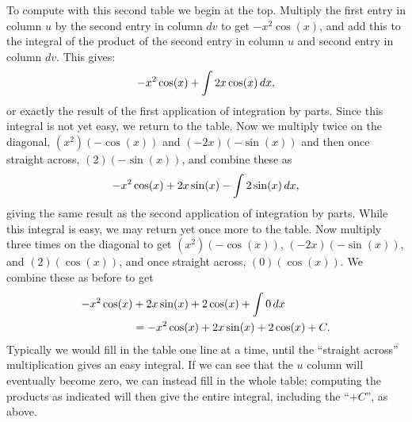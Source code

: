 \documentclass{ximera}
\begin{document}
To compute with this second table we begin at the top. Multiply the
first entry in column $u$ by the second entry in column $dv$ to get
$-x^2\cos(x)$, and add this to the integral of the product of the
second entry in column $u$ and second entry in column $dv$.  This
gives:
$$-x^2\cos(x)+\int 2x\cos(x)\mathop{}\!d x,$$
or exactly the result of the first application of integration by
parts.  Since this integral is not yet easy, we return to the table.
Now we multiply twice on the diagonal, $(x^2)(-\cos(x))$ and
$(-2x)(-\sin(x))$ and then once straight across, $(2)(-\sin(x))$, and
combine these as
\[
-x^2\cos(x)+2x\sin(x)-\int 2\sin(x)\mathop{}\!d x,
\]
giving the same result as the second application of integration by
parts. While this integral is easy, we may return yet once more to the
table. Now multiply three times on the diagonal to get
$(x^2)(-\cos(x))$, $(-2x)(-\sin(x))$, and $(2)(\cos(x))$, and once
straight across, $(0)(\cos(x))$. We combine these as before to get
\begin{align*}
  -x^2\cos(x)&+2x\sin(x) +2\cos(x)+\int 0\mathop{}\!d x\\
  &=-x^2\cos(x)+2x\sin(x) +2\cos(x)+C.
\end{align*}
Typically we would fill in the table one line at a time, until the
``straight across'' multiplication gives an easy integral. If we can
see that the $u$ column will eventually become zero, we can instead
fill in the whole table; computing the products as indicated will then
give the entire integral, including the ``$+C$'', as above.
\end{document}

